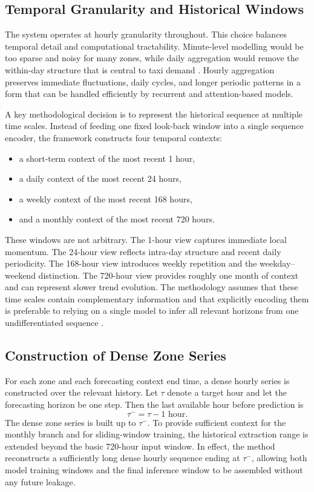 \documentclass[12pt,a4paper]{report}
\begin{document}
\subsection{Temporal Granularity and Historical Windows}

The system operates at hourly granularity throughout. This choice balances temporal detail and computational tractability. Minute-level modelling would be too sparse and noisy for many zones, while daily aggregation would remove the within-day structure that is central to taxi demand \cite{tang2019spatiotemporal,liao2022taxi}. Hourly aggregation preserves immediate fluctuations, daily cycles, and longer periodic patterns in a form that can be handled efficiently by recurrent and attention-based models.

A key methodological decision is to represent the historical sequence at multiple time scales. Instead of feeding one fixed look-back window into a single sequence encoder, the framework constructs four temporal contexts:
\begin{itemize}
	\item a short-term context of the most recent 1 hour,
	\item a daily context of the most recent 24 hours,
	\item a weekly context of the most recent 168 hours,
	\item and a monthly context of the most recent 720 hours.
\end{itemize}

These windows are not arbitrary. The 1-hour view captures immediate local momentum. The 24-hour view reflects intra-day structure and recent daily periodicity. The 168-hour view introduces weekly repetition and the weekday--weekend distinction. The 720-hour view provides roughly one month of context and can represent slower trend evolution. The methodology assumes that these time scales contain complementary information and that explicitly encoding them is preferable to relying on a single model to infer all relevant horizons from one undifferentiated sequence \cite{liao2022taxi,huang2021multiresolution,lim2021survey}.

\subsection{Construction of Dense Zone Series}

For each zone and each forecasting context end time, a dense hourly series is constructed over the relevant history. Let \(\tau\) denote a target hour and let the forecasting horizon be one step. Then the last available hour before prediction is
\[
\tau^- = \tau - 1 \text{ hour}.
\]
The dense zone series is built up to \(\tau^-\). To provide sufficient context for the monthly branch and for sliding-window training, the historical extraction range is extended beyond the basic 720-hour input window. In effect, the method reconstructs a sufficiently long dense hourly sequence ending at \(\tau^-\), allowing both model training windows and the final inference window to be assembled without any future leakage.
\end{document}
